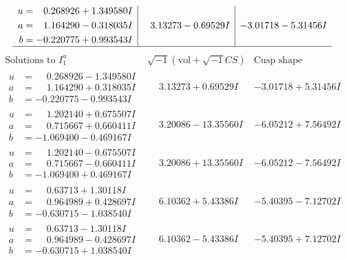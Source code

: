 \documentclass[1p]{elsarticle_modified}
\theoremstyle{definition}
\newcommand{\I}{\sqrt{-1}}
\begin{document}
$$\begin{array}{c|c|c}
\begin{aligned}
u &= \phantom{-}0.268926 + 1.349580 I \\
a &= \phantom{-}1.164290 - 0.318035 I \\
b &= -0.220775 + 0.993543 I\end{aligned}
 & \phantom{-}3.13273 - 0.69529 I & -3.01718 - 5.31456 I\\
 \hline 
 \end{array}$$\newpage$$\begin{array}{c|c|c}  
\text{Solutions to }I^u_{1}& \I (\text{vol} + \sqrt{-1}CS) & \text{Cusp shape}\\
 \hline 
\begin{aligned}
u &= \phantom{-}0.268926 - 1.349580 I \\
a &= \phantom{-}1.164290 + 0.318035 I \\
b &= -0.220775 - 0.993543 I\end{aligned}
 & \phantom{-}3.13273 + 0.69529 I & -3.01718 + 5.31456 I \\ \hline\begin{aligned}
u &= \phantom{-}1.202140 + 0.675507 I \\
a &= \phantom{-}0.715667 + 0.660411 I \\
b &= -1.069400 - 0.469167 I\end{aligned}
 & \phantom{-}3.20086 - 13.35560 I & -6.05212 + 7.56492 I \\ \hline\begin{aligned}
u &= \phantom{-}1.202140 - 0.675507 I \\
a &= \phantom{-}0.715667 - 0.660411 I \\
b &= -1.069400 + 0.469167 I\end{aligned}
 & \phantom{-}3.20086 + 13.35560 I & -6.05212 - 7.56492 I \\ \hline\begin{aligned}
u &= \phantom{-}0.63713 + 1.30118 I \\
a &= \phantom{-}0.964989 + 0.428697 I \\
b &= -0.630715 - 1.038540 I\end{aligned}
 & \phantom{-}6.10362 + 5.43386 I & -5.40395 - 7.12702 I \\ \hline\begin{aligned}
u &= \phantom{-}0.63713 - 1.30118 I \\
a &= \phantom{-}0.964989 - 0.428697 I \\
b &= -0.630715 + 1.038540 I\end{aligned}
 & \phantom{-}6.10362 - 5.43386 I & -5.40395 + 7.12702 I \\ \hline\begin{aligned}

\end{aligned}
\end{array}$$
\end{document}
